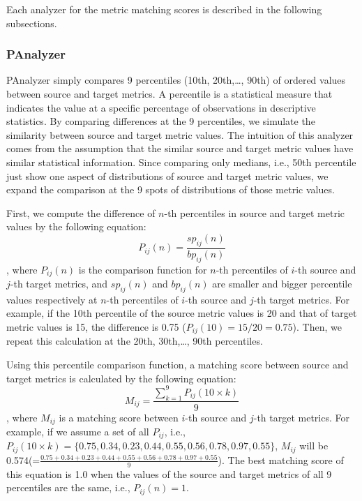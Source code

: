 
Each analyzer for the metric matching scores is described in the following subsections.

\subsubsection{PAnalyzer}
PAnalyzer simply compares 9 percentiles (10th, 20th,\ldots, 90th) of ordered
values between source and target metrics. A percentile is a statistical measure that indicates the value at a specific percentage of observations in descriptive statistics. By comparing differences at the 9 percentiles, we simulate the similarity between source and target metric values. The intuition of this analyzer comes from the assumption that the similar source and target metric values have similar statistical information. Since comparing only medians, i.e., 50th percentile just show one aspect of distributions of source and target metric values, we expand the comparison at the 9 spots of distributions of those metric values.

First, we compute the difference of $n$-th
percentiles in source and target metric values by the following
equation:
\begin{equation}
P_{ij}(n)=\frac{sp_{ij}(n)}{bp_{ij}(n)}
\end{equation}
, where $P_{ij}(n)$ is the comparison function for $n$-th percentiles
of $i$-th source and $j$-th target metrics, and $sp_{ij}(n)$ and $bp_{ij}(n)$
are smaller and bigger percentile values respectively at $n$-th percentiles
of $i$-th source and $j$-th target metrics. For example, if the 10th
percentile of the source metric values is 20 and that of target metric values is
15, the difference is 0.75 ($P_{ij}(10)=15/20=0.75$). Then, we repeat this calculation at the 20th, 30th,\ldots, 90th percentiles.

Using this percentile comparison function, a matching score between source
and target metrics is calculated by the following equation:
\begin{equation}
M_{ij}=\frac{\sum\limits_{k=1}^9
P_{ij}(10\times{k})}{9}\end{equation}
, where $M_{ij}$ is a matching score between $i$-th source and $j$-th
target metrics. For example, if we assume a set of all $P_{ij}$, i.e., $P_{ij}{(10\times{k})}=\{0.75, 0.34, 0.23, 0.44, 0.55, 0.56, 0.78, 0.97, 0.55\}$, $M_{ij}$ will be 0.574(=$\frac{0.75+0.34+0.23+0.44+0.55+0.56+0.78+0.97+0.55}{9}$). The best matching score of this equation is 1.0
when the values of the source and target metrics of all 9 percentiles are the
same, i.e., $P_{ij}(n)=1$.

